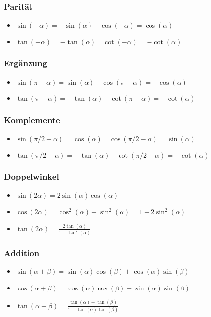 \documentclass[7pt,landscape, margin = 0.1mm]{article}
\begin{document}
\begin{multicols}{4}
\begin{flushleft}
\begin{itemize}
\end{itemize}

\subsubsection{Parität}
\begin{itemize}
 \item $\sin(-\alpha) = - \sin(\alpha) \quad \cos(-\alpha) = \cos(\alpha)$
 \item $\tan(-\alpha) = - \tan(\alpha) \quad \cot(-\alpha) = - \cot(\alpha)$
\end{itemize}

\subsubsection{Ergänzung}
\begin{itemize}
 \item $\sin(\pi - \alpha) = \sin(\alpha) \quad \cos(\pi - \alpha) = - \cos(\alpha)$
 \item $\tan(\pi - \alpha) = -\tan(\alpha) \quad \cot(\pi - \alpha) = - \cot(\alpha)$
\end{itemize}


\subsubsection{Komplemente}
\begin{itemize}
 \item $\sin(\pi/2 - \alpha) = \cos(\alpha) \quad \cos(\pi/2 - \alpha) = \sin(\alpha)$
 \item $\tan(\pi/2 - \alpha) = -\tan(\alpha) \quad \cot(\pi/2 - \alpha) = -\cot(\alpha)$
\end{itemize}

\subsubsection{Doppelwinkel}
\begin{itemize}
 \item $\sin(2\alpha) = 2 \sin(\alpha) \cos(\alpha)$
 \item $\cos(2\alpha) = \cos^2(\alpha) - \sin^2(\alpha) = 1 - 2 \sin^2(\alpha)$
 \item $\tan(2\alpha) = \frac{2\tan(\alpha)}{1 - \tan^2(\alpha)}$
\end{itemize}

\subsubsection{Addition}
\begin{itemize}
 \item $\sin(\alpha + \beta) = \sin(\alpha) \cos(\beta) + \cos(\alpha) \sin(\beta)$
 \item $\cos(\alpha + \beta) = \cos(\alpha) \cos(\beta) - \sin(\alpha) \sin(\beta)$
 \item $\tan(\alpha + \beta) = \frac{\tan(\alpha) + \tan(\beta)}{1 - \tan(\alpha) \tan(\beta)}$
\end{itemize}


\end{flushleft}
\end{multicols}
\end{document}
